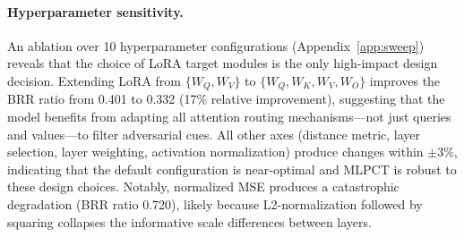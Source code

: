 \paragraph{Hyperparameter sensitivity.} An ablation over 10 hyperparameter configurations (Appendix~\ref{app:sweep}) reveals that the choice of LoRA target modules is the only high-impact design decision. Extending LoRA from $\{W_Q, W_V\}$ to $\{W_Q, W_K, W_V, W_O\}$ improves the BRR ratio from 0.401 to 0.332 (17\% relative improvement), suggesting that the model benefits from adapting all attention routing mechanisms---not just queries and values---to filter adversarial cues. All other axes (distance metric, layer selection, layer weighting, activation normalization) produce changes within $\pm 3$\%, indicating that the default configuration is near-optimal and MLPCT is robust to these design choices. Notably, normalized MSE produces a catastrophic degradation (BRR ratio 0.720), likely because L2-normalization followed by squaring collapses the informative scale differences between layers.
